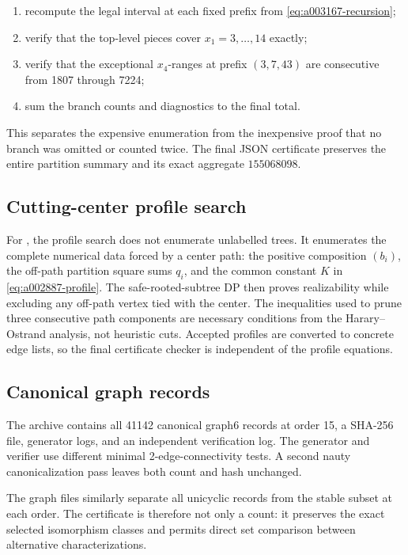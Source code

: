 \begin{enumerate}
\item recompute the legal interval at each fixed prefix from
      \cref{eq:a003167-recursion};
\item verify that the top-level pieces cover \(x_1=3,\ldots,14\) exactly;
\item verify that the exceptional \(x_4\)-ranges at prefix
      \((3,7,43)\) are consecutive from 1807 through 7224;
\item sum the branch counts and diagnostics to the final total.
\end{enumerate}

This separates the expensive enumeration from the inexpensive proof that no
branch was omitted or counted twice.  The final JSON certificate preserves the
entire partition summary and its exact aggregate
\(155068098\).

\subsection{Cutting-center profile search}

For , the profile search does not enumerate unlabelled trees.  It
enumerates the complete numerical data forced by a center path: the positive
composition \((b_i)\), the off-path partition square sums \(q_i\), and the
common constant \(K\) in \cref{eq:a002887-profile}.  The safe-rooted-subtree
DP then proves realizability while excluding any off-path vertex tied with the
center.  The inequalities used to prune three consecutive path components are
necessary conditions from the Harary--Ostrand analysis, not heuristic cuts.
Accepted profiles are converted to concrete edge lists, so the final
certificate checker is independent of the profile equations.

\subsection{Canonical graph records}

The  archive contains all 41142 canonical graph6 records at order
15, a SHA-256 file, generator logs, and an independent verification log.  The
generator and verifier use different minimal 2-edge-connectivity tests.  A
second nauty canonicalization pass leaves both count and hash unchanged.

The  graph files similarly separate all unicyclic records from the
stable subset at each order.  The certificate is therefore not only a count:
it preserves the exact selected isomorphism classes and permits direct set
comparison between alternative characterizations.

